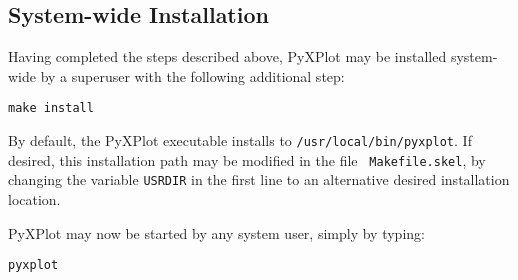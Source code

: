 \subsection{System-wide Installation}

Having completed the steps described above, PyXPlot may be installed
system-wide by a superuser with the following additional
step:

\begin{verbatim}
make install
\end{verbatim}

By default, the PyXPlot executable installs to {\tt /usr/local/bin/pyxplot}.
If desired, this installation path may be modified in the file {\tt
Makefile.skel}, by changing the variable {\tt USRDIR} in the first line to an
alternative desired installation location.

PyXPlot may now be started by any system user, simply by typing:

\begin{verbatim}
pyxplot
\end{verbatim}

